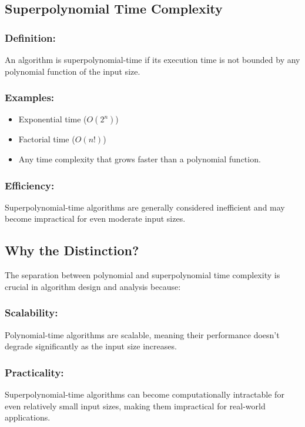 \documentclass[12pt]{article}
\begin{document}
    \subsection{Superpolynomial Time Complexity}

    \subsubsection{Definition:}
    An algorithm is superpolynomial-time if its execution time is not bounded by any polynomial function of the input size.

    \subsubsection{Examples:}
    \begin{itemize}
        \item Exponential time ($O(2^n)$)
        \item Factorial time ($O(n!)$)
        \item Any time complexity that grows faster than a polynomial function.
    \end{itemize}

    \subsubsection{Efficiency:}
    Superpolynomial-time algorithms are generally considered inefficient and may become impractical for even moderate input sizes.

    \subsection{Why the Distinction?}
    The separation between polynomial and superpolynomial time complexity is crucial in algorithm design and analysis because:

    \subsubsection{Scalability:}
    Polynomial-time algorithms are scalable, meaning their performance doesn't degrade significantly as the input size increases.

    \subsubsection{Practicality:}
    Superpolynomial-time algorithms can become computationally intractable for even relatively small input sizes, making them impractical for real-world applications.
\end{document}
